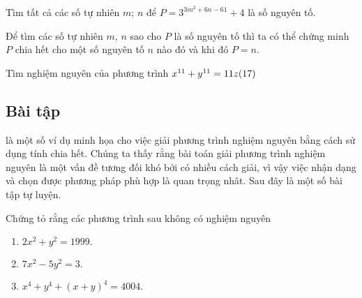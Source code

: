 \begin{vd}%
	Tìm tất cả các số tự nhiên $m$; $n$ để $P=3^{3m^2+6n-61}+4$ là số nguyên tố.
	\begin{nx}
		Để tìm các số tự nhiên $m$, $n$ sao cho $P$ là số nguyên tố thì ta có thể chứng minh $P$ chia hết cho một số nguyên tố $n$ nào đó và khi đó $P=n$.
	\end{nx}
	
\end{vd}


\begin{vd}%
	Tìm nghiệm nguyên của phương trình $x^{11}+y^{11}=11z \hfill (17)$
	
\end{vd}
\subsection{Bài tập}
 là một số ví dụ minh họa cho việc giải phương trình nghiệm nguyên bằng cách sử dụng tính chia hết. Chúng ta thấy rằng bài toán giải phương trình nghiệm nguyên là một vấn đề tương đối khó bởi có nhiều cách giải, vì vậy việc nhận dạng và chọn được phương pháp phù hợp là quan trọng nhât. Sau đây là một số bài tập tự luyện.

\begin{bt}%
	Chứng tỏ rằng các phương trình sau không có nghiệm nguyên
	\begin{enumerate}
		\item $2x^2+y^2=1999.$
		\item $7x^2-5y^2=3.$
		\item $x^4+y^4+(x+y)^4=4004.$
	\end{enumerate}
\end{bt}


